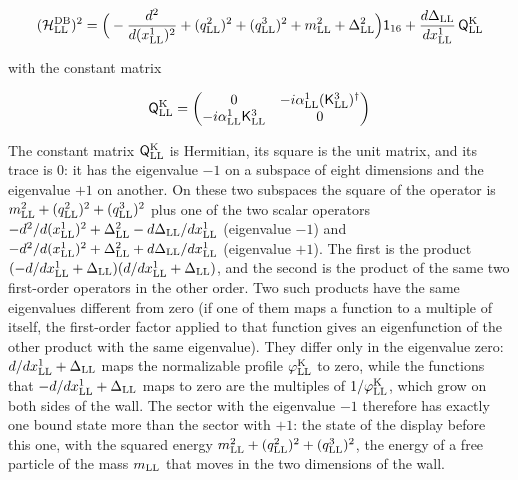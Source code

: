 \documentclass[
  10pt,
]{article}
\begin{document}
\[(\mathcal H^{\rm DB}_{\rm LL})^2=\Big(-\frac{d^2}{d(x^1_{\rm LL})^2}+(q^2_{\rm LL})^2+(q^3_{\rm LL})^2+m_{\rm LL}^2+\Delta_{\rm LL}^2\Big)\mathsf 1_{16}+\frac{d\Delta_{\rm LL}}{dx^1_{\rm LL}}\,\mathsf Q^{\rm K}_{\rm LL}\]

with the constant matrix

\[\mathsf Q^{\rm K}_{\rm LL}=\begin{pmatrix}0&-i\alpha^1_{\rm LL}(\mathsf K^3_{\rm LL})^\dagger\\-i\alpha^1_{\rm LL}\mathsf K^3_{\rm LL}&0\end{pmatrix}\]

The constant matrix \(\mathsf Q^{\rm K}_{\rm LL}\) is Hermitian, its
square is the unit matrix, and its trace is 0: it has the eigenvalue
\(-1\) on a subspace of eight dimensions and the eigenvalue \(+1\) on
another. On these two subspaces the square of the operator is
\(m_{\rm LL}^2+(q^2_{\rm LL})^2+(q^3_{\rm LL})^2\) plus one of the two
scalar operators
\(-d^2/d(x^1_{\rm LL})^2+\Delta_{\rm LL}^2-d\Delta_{\rm LL}/dx^1_{\rm LL}\)
(eigenvalue \(-1\)) and
\(-d^2/d(x^1_{\rm LL})^2+\Delta_{\rm LL}^2+d\Delta_{\rm LL}/dx^1_{\rm LL}\)
(eigenvalue \(+1\)). The first is the product
\((-d/dx^1_{\rm LL}+\Delta_{\rm LL})(d/dx^1_{\rm LL}+\Delta_{\rm LL})\),
and the second is the product of the same two first-order operators in
the other order. Two such products have the same eigenvalues different
from zero (if one of them maps a function to a multiple of itself, the
first-order factor applied to that function gives an eigenfunction of
the other product with the same eigenvalue). They differ only in the
eigenvalue zero: \(d/dx^1_{\rm LL}+\Delta_{\rm LL}\) maps the
normalizable profile \(\varphi^{\rm K}_{\rm LL}\) to zero, while the
functions that \(-d/dx^1_{\rm LL}+\Delta_{\rm LL}\) maps to zero are the
multiples of \(1/\varphi^{\rm K}_{\rm LL}\), which grow on both sides of
the wall. The sector with the eigenvalue \(-1\) therefore has exactly
one bound state more than the sector with \(+1\): the state of the
display before this one, with the squared energy
\(m_{\rm LL}^2+(q^2_{\rm LL})^2+(q^3_{\rm LL})^2\), the energy of a free
particle of the mass \(m_{\rm LL}\) that moves in the two dimensions of
the wall.
\end{document}
